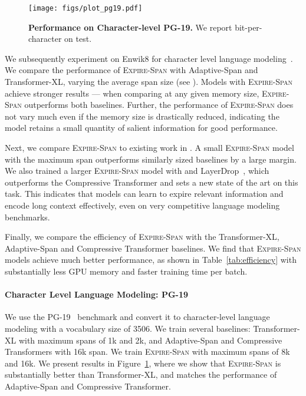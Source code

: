 \begin{figure}
    \centering
    \texttt{[image: figs/plot\_pg19.pdf]}
    \caption{\textbf{Performance on Character-level PG-19.}  We report bit-per-character on test.}
    \label{fig:pg19}
\end{figure}

We subsequently experiment on Enwik8 for character level language modeling~\citep{mahoney2011large}.  
We compare the performance of \textsc{Expire-Span} with Adaptive-Span and Transformer-XL, varying the average span size (see ). Models with \textsc{Expire-Span} achieve stronger results --- when comparing at any given memory size, \textsc{Expire-Span} outperforms both baselines. Further, the performance of \textsc{Expire-Span} does not vary much even if the memory size is drastically reduced, indicating the model retains a small quantity of salient information for good performance.

Next, we compare \textsc{Expire-Span} to existing work in . A small \textsc{Expire-Span} model with the maximum span  outperforms similarly sized baselines by a large margin.
We also trained a larger \textsc{Expire-Span} model with  and LayerDrop~\cite{Fan2020Reducing}, which outperforms the Compressive Transformer and sets a new state of the art on this task. 
This indicates that models can learn to expire relevant information and encode long context effectively, even on very competitive language modeling benchmarks.

Finally, we compare the efficiency of \textsc{Expire-Span} with the Transformer-XL, Adaptive-Span and Compressive Transformer baselines. 
We find that \textsc{Expire-Span} models achieve much better performance, as shown in Table~\ref{tab:efficiency} with substantially less GPU memory and faster training time per batch. 


\paragraph{Character Level Language Modeling: PG-19} 

We use the PG-19~\citep{rae2020compressive} benchmark and convert it to character-level language modeling with a vocabulary size of 3506.
We train several baselines: Transformer-XL with maximum spans of 1k and 2k, and Adaptive-Span and Compressive Transformers with 16k span.
We train \textsc{Expire-Span} with maximum spans of 8k and 16k.
We present results in Figure~\ref{fig:pg19}, where we show that  \textsc{Expire-Span} is substantially better than Transformer-XL, and matches the performance of Adaptive-Span and Compressive Transformer.

